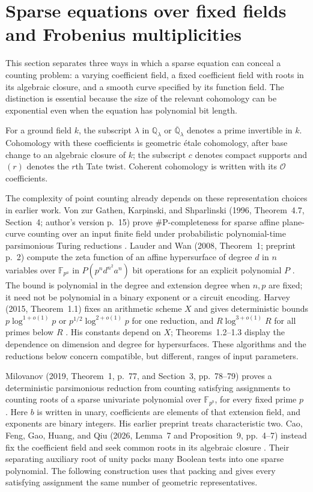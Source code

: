 \section{Sparse equations over fixed fields and Frobenius multiplicities}
\label{sec:ff}
This section separates three ways in which a sparse equation can conceal a counting problem: a varying coefficient field, a fixed coefficient field with roots in its algebraic closure, and a smooth curve specified by its function field. The distinction is essential because the size of the relevant cohomology can be exponential even when the equation has polynomial bit length.

For a ground field $k$, the subscript $\lambda$ in $\mathbb Q_\lambda$ or $\overline{\mathbb Q}_\lambda$ denotes a prime invertible in $k$. Cohomology with these coefficients is geometric \'etale cohomology, after base change to an algebraic closure of $k$; the subscript $c$ denotes compact supports and $(r)$ denotes the $r$th Tate twist. Coherent cohomology is written with its $\mathcal O$ coefficients.

The complexity of point counting already depends on these representation choices in earlier work. Von zur Gathen, Karpinski, and Shparlinski (1996, Theorem~4.7, Section~4; author's version p.~15) prove $\#\mathrm P$-completeness for sparse affine plane-curve counting over an input finite field under probabilistic polynomial-time parsimonious Turing reductions \cite{ff-gathen}. Lauder and Wan (2008, Theorem~1; preprint p.~2) compute the zeta function of an affine hypersurface of degree $d$ in $n$ variables over $\mathbb F_{p^a}$ in $P(p^nd^{n^2}a^n)$ bit operations for an explicit polynomial $P$ \cite{ff-lauder-wan}. The bound is polynomial in the degree and extension degree when $n,p$ are fixed; it need not be polynomial in a binary exponent or a circuit encoding. Harvey (2015, Theorem~1.1) fixes an arithmetic scheme $X$ and gives deterministic bounds $p\log^{1+o(1)}p$ or $p^{1/2}\log^{2+o(1)}p$ for one reduction, and $R\log^{3+o(1)}R$ for all primes below $R$ \cite{ff-harvey}. His constants depend on $X$; Theorems~1.2--1.3 display the dependence on dimension and degree for hypersurfaces. These algorithms and the reductions below concern compatible, but different, ranges of input parameters.

Milovanov (2019, Theorem~1, p.~77, and Section~3, pp.~78--79) proves a deterministic parsimonious reduction from counting satisfying assignments to counting roots of a sparse univariate polynomial over $\mathbb F_{p^b}$, for every fixed prime $p$ \cite{ff-milovanov}. Here $b$ is written in unary, coefficients are elements of that extension field, and exponents are binary integers. His earlier preprint treats characteristic two. Cao, Feng, Gao, Huang, and Qiu (2026, Lemma~7 and Proposition~9, pp.~4--7) instead fix the coefficient field and seek common roots in its algebraic closure \cite{ff-cao}. Their separating auxiliary root of unity packs many Boolean tests into one sparse polynomial. The following construction uses that packing and gives every satisfying assignment the same number of geometric representatives.

